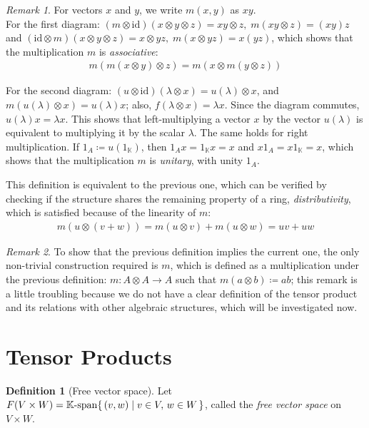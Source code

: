 \documentclass{article}
\theoremstyle{definition}
\newtheorem{Definition}{Definition}
\theoremstyle{remark}
\newtheorem*{Remark*}{Remark}
\theoremstyle{underline}
\theoremstyle{underline}
\newcommand{\id}{\mathrm{id}}
\begin{document}
	\begin{Remark*} For vectors $x$ and $y$, we write $m(x, y)$ as $xy$.\\
		For the first diagram: $(m \otimes \id)(x \otimes y \otimes z) = xy \otimes z,\; m(xy \otimes z) = (xy)z $ and $(\id \otimes m)(x \otimes y \otimes z) = x \otimes y z,\; m(x \otimes yz) = x(yz)$, which shows that the multiplication $m$ is \emph{associative}:
		\begin{gather*}
		m(m(x \otimes y) \otimes z) = m(x \otimes m(y \otimes z))
		\end{gather*}
		
		For the second diagram: $(u \otimes \id) (\lambda \otimes x) = u(\lambda) \otimes x$, and $m(u(\lambda) \otimes x) = u(\lambda) x$; also, $f(\lambda \otimes x) = \lambda x$. Since the diagram commutes, $u(\lambda) x = \lambda x$. This shows that left-multiplying a vector $x$ by the vector $u(\lambda)$ is equivalent to multiplying it by the scalar $\lambda$. The same holds for right multiplication. If $1_A \coloneqq u(1_{\mathbb K})$, then $1_A x = 1_{\mathbb K} x = x$ and $x 1_A = x 1_{\mathbb K} = x$, which shows that the multiplication $m$ is \emph{unitary}, with unity $1_A$.
		
		This definition is equivalent to the previous one, which can be verified by checking if the structure shares the remaining property of a ring, \emph{distributivity}, which is satisfied because of the linearity of $m$:
		\begin{gather*}
		m(u \otimes (v + w)) = m(u \otimes v) + m(u \otimes w) = uv + uw
		\end{gather*}
	\end{Remark*}
	
	\begin{Remark*}
		To show that the previous definition implies the current one, the only non-trivial construction required is $m$, which is defined as a multiplication under the previous definition: $m\colon A \otimes A \rightarrow A$ such that $ m(a \otimes b) \coloneqq ab $; this remark is a little troubling because we do not have a clear definition of the tensor product and its relations with other algebraic structures, which will be investigated now.
	\end{Remark*}
	
	\section{Tensor Products}
	
	\begin{Definition}[Free vector space]
		Let $F(V \times W) = \mathbb K\text{-}\mathrm{span}\qty{\, (v, w) \mid v \in V,\, w \in W\, }$, called the \emph{free vector space} on $V \times W$.
	\end{Definition}
	
\end{document}
